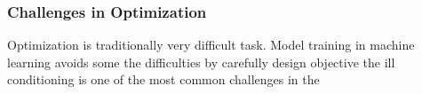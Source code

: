 \subsubsection{Challenges in Optimization}

Optimization is traditionally very difficult task. Model training in machine learning avoids some the difficulties by carefully design objective 
the ill conditioning is one of the most common challenges in the 